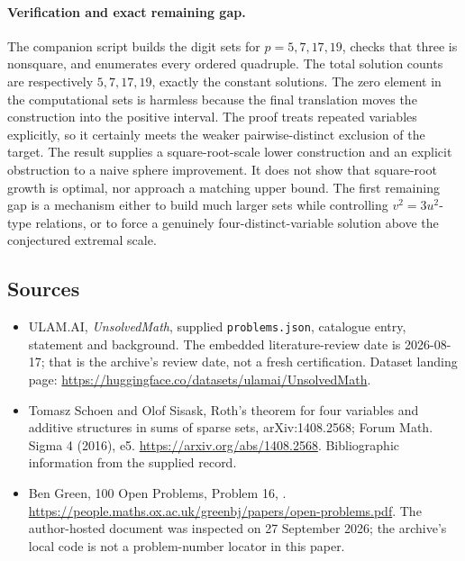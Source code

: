 \documentclass[11pt,a4paper]{article}
\begin{document}
\paragraph{Verification and exact remaining gap.}
The companion script builds the digit sets for $p=5,7,17,19$, checks that three is nonsquare, and enumerates every ordered quadruple. The total solution counts are respectively $5,7,17,19$, exactly the constant solutions. The zero element in the computational sets is harmless because the final translation moves the construction into the positive interval. The proof treats repeated variables explicitly, so it certainly meets the weaker pairwise-distinct exclusion of the target. The result supplies a square-root-scale lower construction and an explicit obstruction to a naive sphere improvement. It does not show that square-root growth is optimal, nor approach a matching upper bound. The first remaining gap is a mechanism either to build much larger sets while controlling $v^2=3u^2$-type relations, or to force a genuinely four-distinct-variable solution above the conjectured extremal scale.

\subsection{Sources}

{\small

\begin{itemize}

\item[\hypertarget{source:statement:1}{S1}] ULAM.AI, \emph{UnsolvedMath}, supplied \texttt{problems.json}, catalogue entry, statement and background. The embedded literature-review date is 2026-08-17; that is the archive’s review date, not a fresh certification. Dataset landing page: \url{https://huggingface.co/datasets/ulamai/UnsolvedMath}.

\item[\hypertarget{source:statement:2}{S2}] Tomasz Schoen and Olof Sisask, Roth's theorem for four variables and additive structures in sums of sparse sets, arXiv:1408.2568; Forum Math. Sigma 4 (2016), e5. \url{https://arxiv.org/abs/1408.2568}. Bibliographic information from the supplied record.

\item[\hypertarget{source:statement:3}{S3}] Ben Green, 100 Open Problems, Problem 16, . \url{https://people.maths.ox.ac.uk/greenbj/papers/open-problems.pdf}. The author-hosted document was inspected on 27 September 2026; the archive’s local code is not a problem-number locator in this paper.

\end{itemize}

}

\label{end:statement}
\end{document}
